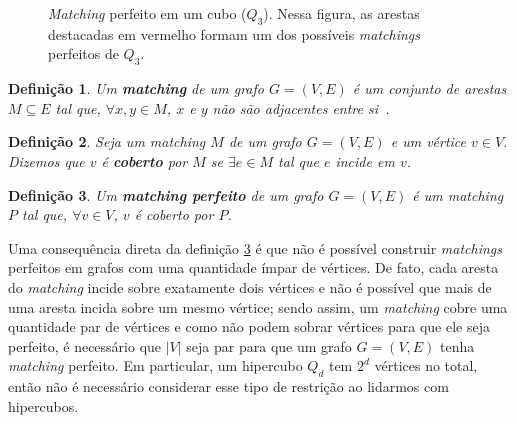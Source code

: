 \documentclass[12pt, a4paper]{article}
\newtheorem{definition}{Definição}[section]
\begin{document}
\begin{figure}[h] \label{fig:cube-graph-matching}
    \centering
    \caption{\textit{Matching} perfeito em um cubo ($Q_3$). Nessa figura, as arestas destacadas em vermelho formam um dos possíveis \textit{matchings} perfeitos de $Q_3$.}
\end{figure}

\begin{definition}
    Um \textbf{\textit{matching}} de um grafo $G = (V, E)$ é um conjunto de arestas $M \subseteq E$ tal que, $\forall x, y \in M$, $x$ e $y$ não são adjacentes entre si~\cite[p.~237]{socorro_rangel_elementos_2018}.
\end{definition}

\begin{definition}
    Seja um \textit{matching} $M$ de um grafo $G = (V, E)$ e um vértice $v \in V$. Dizemos que $v$ é \textbf{coberto} por $M$ se $\exists e \in M$ tal que $e$ incide em $v$.
\end{definition}

\begin{definition} \label{def:perfect-matching}
    Um \textbf{\textit{matching} perfeito} de um grafo $G = (V, E)$ é um \textit{matching} $P$ tal que, $\forall v \in V$, $v$ é coberto por $P$.
\end{definition}

Uma consequência direta da definição \ref{def:perfect-matching} é que não é possível construir \textit{matchings} perfeitos em grafos com uma quantidade ímpar de vértices. De fato, cada aresta do \textit{matching} incide sobre exatamente dois vértices e não é possível que mais de uma aresta incida sobre um mesmo vértice; sendo assim, um \textit{matching} cobre uma quantidade par de vértices e como não podem sobrar vértices para que ele seja perfeito, é necessário que $|V|$ seja par para que um grafo $G=(V,E)$ tenha \textit{matching} perfeito. Em particular, um hipercubo $Q_d$ tem $2^d$ vértices no total, então não é necessário considerar esse tipo de restrição ao lidarmos com hipercubos.
\end{document}
